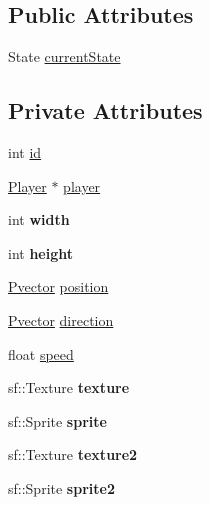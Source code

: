 \subsection*{Public Attributes}
\begin{DoxyCompactItemize}
\item 
State \hyperlink{class_factory_afb44bf46ba534e32cc3ab587c481fd08}{current\+State}
\end{DoxyCompactItemize}
\subsection*{Private Attributes}
\begin{DoxyCompactItemize}
\item 
int \hyperlink{class_factory_ae4674e47d76d1ee285c6f756f78717b3}{id}
\item 
\hyperlink{class_player}{Player} $\ast$ \hyperlink{class_factory_a41f72cef38976b5cd6f5bfae2f1e0793}{player}
\item 
int {\bfseries width}\hypertarget{class_factory_ab8e22d3045f9878e01cf40594f6898f4}{}\label{class_factory_ab8e22d3045f9878e01cf40594f6898f4}

\item 
int {\bfseries height}\hypertarget{class_factory_a68093b12f9f3451cd0aa217c62103d6a}{}\label{class_factory_a68093b12f9f3451cd0aa217c62103d6a}

\item 
\hyperlink{class_pvector}{Pvector} \hyperlink{class_factory_af5a5d19e6d5a0d4856cb6f78c3a53bdb}{position}
\item 
\hyperlink{class_pvector}{Pvector} \hyperlink{class_factory_a637041324e7a78cd1b099d8b5297e3f1}{direction}
\item 
float \hyperlink{class_factory_a9c83ade0995267b665b01332e5ee094a}{speed}
\item 
sf\+::\+Texture {\bfseries texture}\hypertarget{class_factory_afa972f79251703170ba6594fc358a084}{}\label{class_factory_afa972f79251703170ba6594fc358a084}

\item 
sf\+::\+Sprite {\bfseries sprite}\hypertarget{class_factory_ad264a8d045b892d75a82e400c52831f3}{}\label{class_factory_ad264a8d045b892d75a82e400c52831f3}

\item 
sf\+::\+Texture {\bfseries texture2}\hypertarget{class_factory_a74d3afbb950ea960d224d7dac78459b2}{}\label{class_factory_a74d3afbb950ea960d224d7dac78459b2}

\item 
sf\+::\+Sprite {\bfseries sprite2}\hypertarget{class_factory_ad939e8357f6d54e5920529af21d9451d}{}\label{class_factory_ad939e8357f6d54e5920529af21d9451d}


\end{DoxyCompactItemize}
